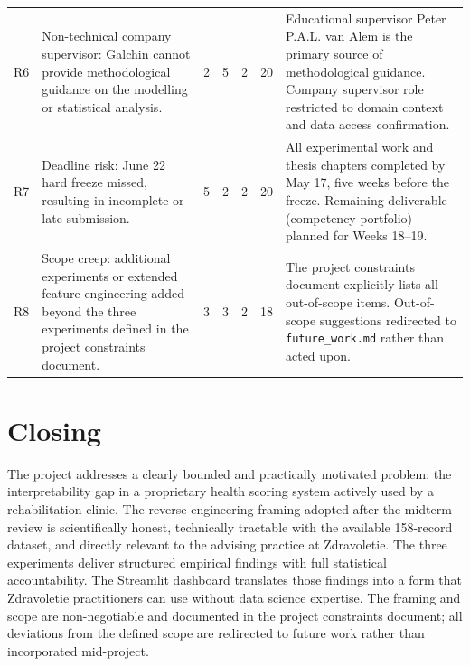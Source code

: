 \documentclass[11pt,a4paper]{article}
\begin{document}
\begin{longtable}{p{0.3cm} p{5.5cm} c c c c p{5.5cm}}
  R6 & Non-technical company supervisor: Galchin cannot provide methodological guidance on the modelling or statistical analysis. & 2 & 5 & 2 & 20 &
    Educational supervisor Peter P.A.L. van Alem is the primary source of methodological guidance. Company supervisor role restricted to domain context and data access confirmation. \\[4pt]
  R7 & Deadline risk: June 22 hard freeze missed, resulting in incomplete or late submission. & 5 & 2 & 2 & 20 &
    All experimental work and thesis chapters completed by May 17, five weeks before the freeze. Remaining deliverable (competency portfolio) planned for Weeks 18--19. \\[4pt]
  R8 & Scope creep: additional experiments or extended feature engineering added beyond the three experiments defined in the project constraints document. & 3 & 3 & 2 & 18 &
    The project constraints document explicitly lists all out-of-scope items. Out-of-scope suggestions redirected to \texttt{future\_work.md} rather than acted upon. \\
\end{longtable}

\section{Closing}

The project addresses a clearly bounded and practically motivated problem: the interpretability gap in a proprietary health scoring system actively used by a rehabilitation clinic. The reverse-engineering framing adopted after the midterm review is scientifically honest, technically tractable with the available 158-record dataset, and directly relevant to the advising practice at Zdravoletie. The three experiments deliver structured empirical findings with full statistical accountability. The Streamlit dashboard translates those findings into a form that Zdravoletie practitioners can use without data science expertise. The framing and scope are non-negotiable and documented in the project constraints document; all deviations from the defined scope are redirected to future work rather than incorporated mid-project.
\end{document}
